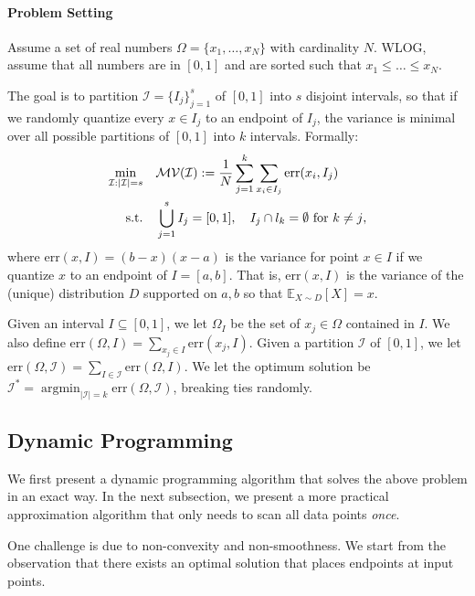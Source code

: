 \documentclass{article}
\def\E{\mathbb{E}}
\newcommand{\err}{\ensuremath{\mathrm{err}}}
\newcommand{\setX}{\Omega}
\newcommand{\setI}{\mathcal{I}}
\DeclareMathOperator*{\argmin}{argmin}
\begin{document}
\paragraph*{Problem Setting}
Assume a set of real numbers $\Omega = \{x_1, \ldots, x_N\}$ with cardinality $N$. WLOG, assume that all numbers are in $[0, 1]$ and are sorted such that $x_1 \leq \ldots \leq x_N$. 

The goal is to partition $\setI = \{I_j\}_{j = 1}^s$ of $[0, 1]$ into $s$ disjoint intervals, so that if we randomly quantize every $x \in I_j$ to an endpoint of $I_j$, the variance is minimal over all possible partitions of $[0, 1]$ into $k$ intervals.
Formally:
\vspace{-0.5em}
\begin{align}
\nonumber \min_{\setI: |\setI| = s} \quad & \mathcal{MV}(\setI) := {1\over N}\sum_{j = 1}^k \sum_{x_i \in I_j} \err(x_i, I_j)\\
\text{s.t.}\quad & \bigcup_{j = 1}^s I_j = [0, 1],\quad I_j\cap l_k = \emptyset~\text{for $k\neq j$},
\label{eq:opt_Q}
\end{align}
where $\err (x, I) = (b - x) (x - a)$ is the variance for point $x \in I$ if we quantize $x$ to an endpoint of $I = [a, b]$.
That is, $\err (x, I)$ is the variance of the (unique) distribution $D$ supported on ${a, b}$ so that $\E_{X \sim D} [X] = x$.

Given an interval $I \subseteq [0, 1]$, we let $\setX_I$ be the set of $x_j \in \setX$ contained in $I$.
We also define $\err (\setX, I) = \sum_{x_j \in I} \err (x_j, I)$.
Given a partition $\setI$ of $[0, 1]$, we let $\err (\setX, \setI) = \sum_{I \in \setI} \err (\setX, I)$.
We let the optimum solution be $\setI^* = \argmin_{|\setI| = k} \err (\setX, \setI)$, breaking ties randomly. 

\vspace{-1em}
\subsection{Dynamic Programming}
\vspace{-0.5em}

We first present a dynamic programming algorithm that solves the above problem in an exact way. In the next subsection, we present a more practical approximation algorithm that only needs to scan all data points \emph{once}.

\vspace{-0.5em}
One challenge is due to non-convexity and non-smoothness. 
We start from the observation that there exists an optimal solution that places endpoints at input points. 
\end{document}
